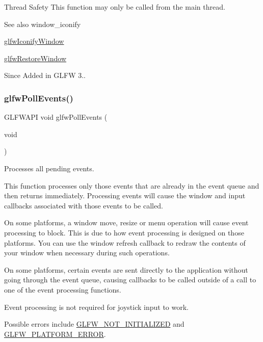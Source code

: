 \begin{DoxyParagraph}{Thread Safety}
This function may only be called from the main thread.
\end{DoxyParagraph}
\begin{DoxySeeAlso}{See also}
window\+\_\+iconify 

\hyperlink{group__window_ga24274e3c6ecd44e11fec5e6b66e4d7f3}{glfw\+Iconify\+Window} 

\hyperlink{group__window_ga1e29caf0b819f578b04db52fff17256c}{glfw\+Restore\+Window}
\end{DoxySeeAlso}
\begin{DoxySince}{Since}
Added in G\+L\+FW 3.. 
\end{DoxySince}
\mbox{\label{group__window_ga872d16e4c77f58c0436f356255920cfc}} 
\subsubsection{\texorpdfstring{glfw\+Poll\+Events()}{glfwPollEvents()}}
{\footnotesize\ttfamily G\+L\+F\+W\+A\+PI void glfw\+Poll\+Events (\begin{DoxyParamCaption}\item[{void}]{ }\end{DoxyParamCaption})}



Processes all pending events. 

This function processes only those events that are already in the event queue and then returns immediately. Processing events will cause the window and input callbacks associated with those events to be called.

On some platforms, a window move, resize or menu operation will cause event processing to block. This is due to how event processing is designed on those platforms. You can use the window refresh callback to redraw the contents of your window when necessary during such operations.

On some platforms, certain events are sent directly to the application without going through the event queue, causing callbacks to be called outside of a call to one of the event processing functions.

Event processing is not required for joystick input to work.

Possible errors include \hyperlink{group__errors_ga2374ee02c177f12e1fa76ff3ed15e14a}{G\+L\+F\+W\+\_\+\+N\+O\+T\+\_\+\+I\+N\+I\+T\+I\+A\+L\+I\+Z\+ED} and \hyperlink{group__errors_gad44162d78100ea5e87cdd38426b8c7a1}{G\+L\+F\+W\+\_\+\+P\+L\+A\+T\+F\+O\+R\+M\+\_\+\+E\+R\+R\+OR}.


